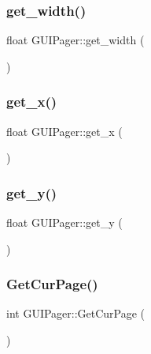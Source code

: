\hypertarget{class_g_u_i_pager_a09a2d9e575563a4828067ab5f060a5f8}{}\label{class_g_u_i_pager_a09a2d9e575563a4828067ab5f060a5f8} 
\subsubsection{\texorpdfstring{get\+\_\+width()}{get\_width()}}
{\footnotesize\ttfamily float G\+U\+I\+Pager\+::get\+\_\+width (\begin{DoxyParamCaption}{ }\end{DoxyParamCaption})}

\hypertarget{class_g_u_i_pager_a805840981c8fb26bb137e13b8810eb37}{}\label{class_g_u_i_pager_a805840981c8fb26bb137e13b8810eb37} 
\subsubsection{\texorpdfstring{get\+\_\+x()}{get\_x()}}
{\footnotesize\ttfamily float G\+U\+I\+Pager\+::get\+\_\+x (\begin{DoxyParamCaption}{ }\end{DoxyParamCaption})}

\hypertarget{class_g_u_i_pager_a4043a46e4903a50a80e0065894c5e543}{}\label{class_g_u_i_pager_a4043a46e4903a50a80e0065894c5e543} 
\subsubsection{\texorpdfstring{get\+\_\+y()}{get\_y()}}
{\footnotesize\ttfamily float G\+U\+I\+Pager\+::get\+\_\+y (\begin{DoxyParamCaption}{ }\end{DoxyParamCaption})}

\hypertarget{class_g_u_i_pager_a43c8309713f66f6046155421e3885e57}{}\label{class_g_u_i_pager_a43c8309713f66f6046155421e3885e57} 
\subsubsection{\texorpdfstring{Get\+Cur\+Page()}{GetCurPage()}}
{\footnotesize\ttfamily int G\+U\+I\+Pager\+::\+Get\+Cur\+Page (\begin{DoxyParamCaption}{ }\end{DoxyParamCaption})}

